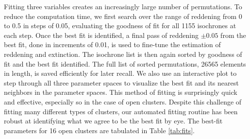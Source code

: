 \documentclass[onecolumn,table,xcdraw,super]{aastex631}
\begin{document}
Fitting three variables creates an increasingly large number of permutations. To reduce the computation time, we first search over the range of reddening from 0 to 0.5 in steps of 0.05, evaluating the goodness of fit for all 1155 isochrones at each step. Once the best fit is identified, a final pass of reddening $\pm 0.05$ from the best fit, done in increments of 0.01, is used to fine-tune the estimation of reddening and extinction. The isochrone list is then again sorted by goodness of fit and the best fit identified. The full list of sorted permutations, 26565 elements in length, is saved efficiently for later recall. We also use an interactive plot to step through all three parameter spaces to visualize the best fit and its nearest neighbors in the parameter spaces. This method of fitting is surprisingly quick and effective, especially so in the case of open clusters. Despite this challenge of fitting many different types of clusters, our automated fitting routine has been robust at identifying what we agree to be the best fit by eye. The best-fit parameters for 16 open clusters are tabulated in Table \ref{tab:fits}.
\end{document}
